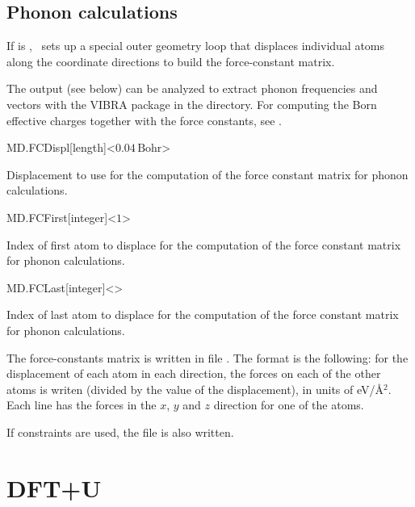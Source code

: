 \subsection{Phonon calculations}

If  is , \siesta\ sets up a special outer
geometry loop that displaces individual atoms along the coordinate
directions to build the force-constant matrix.

The output (see below) can be analyzed to extract phonon frequencies
and vectors with the VIBRA package in the 
directory. For computing the Born effective charges together with the
force constants, see .

\begin{fdfentry}{MD.FCDispl}[length]<$0.04\,\mathrm{Bohr}$>
  
  Displacement to use for the computation of the force constant
  matrix for phonon calculations.

\end{fdfentry}

\begin{fdfentry}{MD.FCFirst}[integer]<$1$>
  
  Index of first atom to displace for the computation of the force
  constant matrix for phonon
  calculations.

\end{fdfentry}

\begin{fdfentry}{MD.FCLast}[integer]<>

  Index of last atom to displace for the computation of the force
  constant matrix for phonon
  calculations.

\end{fdfentry}

The force-constants matrix is written in file .  The
format is the following: for the displacement of each atom in each
direction, the forces on each of the other atoms is writen (divided by
the value of the displacement), in units of eV/\AA$^2$. Each line has
the forces in the $x$, $y$ and $z$ direction for one of the atoms.

If constraints are used, the file  is also written.


\section{DFT+U}
\label{sec:lda+u}

